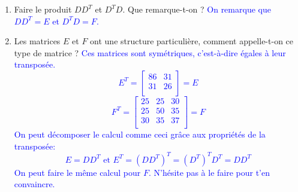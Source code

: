 \documentclass[a4paper]{article}\usepackage[]{graphicx}\usepackage[]{xcolor}
\begin{document}
\begin{enumerate}
    \item Faire le produit $DD^T$ et $D^TD$. Que remarque-t-on ?
    \textcolor{blue}{On remarque que $DD^T = E$ et $D^TD = F$.}
    \item Les matrices $E$ et $F$ ont une structure particulière, comment 
    appelle-t-on ce type de matrice ?
    \textcolor{blue}{Ces matrices sont symétriques, c'est-à-dire égales à leur 
    transposée.
    $$E^T = \begin{bmatrix} 86 &31 \\31 &26 \\ \end{bmatrix} = E$$
    $$F^T = \begin{bmatrix} 25 &25 &30 \\25 &50 &35 \\30 &35 &37 \\ \end{bmatrix} = F$$ 
    On peut décomposer le calcul comme ceci grâce aux propriétés de la 
    transposée:
    $$E = DD^T\text{ et }E^T = (DD^T)^T = (D^T)^T D^T = DD^T$$
    On peut faire le même calcul pour $F$. N'hésite pas à le faire pour t'en 
    convaincre.}
\end{enumerate}
\end{document}
